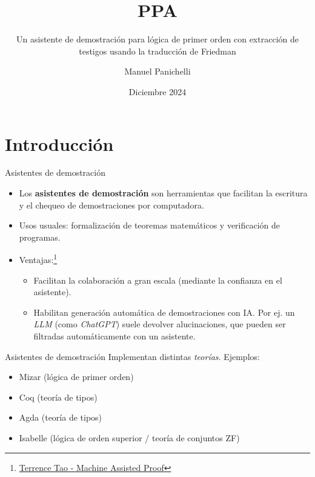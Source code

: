 \documentclass[xcolor={dvipsnames},spanish]{beamer}
\title{PPA}
\subtitle{Un asistente de demostración para
lógica de primer orden con extracción de
testigos usando la traducción de Friedman}
\author{Manuel Panichelli}
\institute{Deparatamento de Computación, FCEyN, UBA}
\date{Diciembre 2024}
\begin{document}
\frame{\titlepage}

\section{Introducción}

\begin{frame}{Asistentes de demostración}
    \begin{itemize}
        \item Los \textbf{asistentes de demostración} son herramientas que
        facilitan la escritura y el chequeo de demostraciones por
        computadora.
        \item Usos usuales: formalización de teoremas matemáticos y verificación de programas.
        \item Ventajas:\footnote{\href{https://youtu.be/AayZuuDDKP0?si=eGETzgh9PQ_8JecR}{Terrence Tao - Machine Assisted Proof}}
        \begin{itemize}
            \item Facilitan la colaboración a gran escala (mediante la confianza en el asistente).
            \item Habilitan generación automática de demostraciones con IA. Por ej. un \textit{LLM} (como \textit{ChatGPT}) suele devolver alucinaciones, que pueden ser filtradas automáticamente con un asistente.
        \end{itemize}
    \end{itemize}
\end{frame}

\begin{frame}{Asistentes de demostración}
    Implementan distintas \textit{teorías}. 
    Ejemplos:
    \begin{itemize}
        \item Mizar (lógica de primer orden)
        \item Coq (teoría de tipos)
        \item Agda (teoría de tipos)
        \item Isabelle (lógica de orden superior / teoría de conjuntos ZF)
    \end{itemize}
\end{frame}
\end{document}
